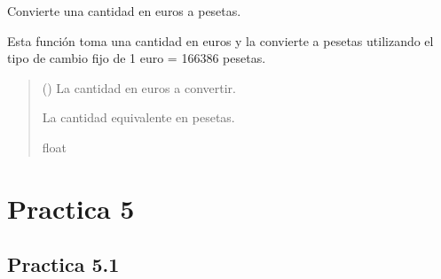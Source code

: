 \documentclass[letterpaper,10pt,spanish]{sphinxmanual}
\begin{document}
\begin{fulllineitems}
\label{\detokenize{pr4:pr4.10.convertir_a_pesetas}}
\pysigstartsignatures
{}
\pysigstopsignatures
\sphinxAtStartPar
Convierte una cantidad en euros a pesetas.

\sphinxAtStartPar
Esta función toma una cantidad en euros y la convierte a pesetas utilizando
el tipo de cambio fijo de 1 euro = 166386 pesetas.
\begin{quote}\begin{description}
\sphinxAtStartPar
{} () \textendash{} La cantidad en euros a convertir.

\sphinxAtStartPar
La cantidad equivalente en pesetas.

\sphinxAtStartPar
float

\end{description}\end{quote}

\end{fulllineitems}


\sphinxstepscope


\chapter{Practica 5}
\label{\detokenize{pr5:practica-5}}\label{\detokenize{pr5::doc}}

\section{Practica 5.1}
\label{\detokenize{pr5:module-pr5.1}}\label{\detokenize{pr5:practica-5-1}}
\end{document}
